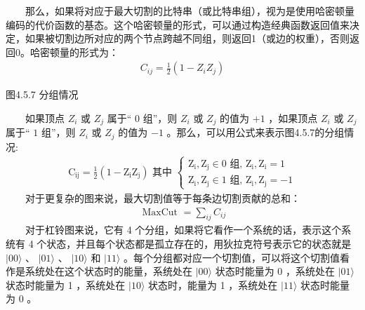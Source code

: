\documentclass[a4paper,11pt,english]{sphinxmanual}
\begin{document}
\sphinxAtStartPar
  那么，如果将对应于最大切割的比特串（或比特串组），视为是使用哈密顿量编码的代价函数的基态。这个哈密顿量的形式，可以通过构造经典函数返回值来决定，如果被切割边所对应的两个节点跨越不同组，则返回1（或边的权重），否则返回0。哈密顿量的形式为：
\begin{equation*}
\begin{split}C_{i j}=\frac{1}{2}\left(1-Z_{i} Z_{j}\right)\end{split}
\end{equation*}

\begin{center}图4.5.7 分组情况
\end{center}
\sphinxAtStartPar
  如果顶点 \(Z_{i}\) 或  \(Z_{j}\) 属于“ \(0\) 组”，则  \(Z_{i}\) 或  \(Z_{j}\) 的值为 \(+1\) ，如果顶点 \(Z_{i}\) 或  \(Z_{j}\) 属于“ \(1\) 组”，则  \(Z_{i}\) 或  \(Z_{j}\) 的值为  \(-1\) 。那么，可以用公式来表示图4.5.7的分组情况:
\begin{equation*}
\begin{split}\mathrm{C}_{\mathrm{ij}}=\frac{1}{2}\left(1-\mathrm{Z}_{\mathrm{i}} \mathrm{Z}_{\mathrm{j}}\right) \text { 其中 }\left\{\begin{array}{l} \mathrm{Z}_{\mathrm{i}}, \mathrm{Z}_{\mathrm{j}} \in 0 \text { 组, } \mathrm{Z}_{\mathrm{i}}, \mathrm{Z}_{\mathrm{i}}=1 \\ \mathrm{Z}_{\mathrm{i}}, \mathrm{Z}_{\mathrm{j}} \in 1 \text { 组, } \mathrm{Z}_{\mathrm{i}}, \mathrm{Z}_{\mathrm{j}}=-1 \end{array}\right.\end{split}
\end{equation*}
\sphinxAtStartPar
  对于更复杂的图来说，最大切割值等于每条边切割贡献的总和：
\begin{equation*}
\begin{split}\text { MaxCut }=\sum_{i j} C_{i j}\end{split}
\end{equation*}
\sphinxAtStartPar
  对于杠铃图来说，它有 4 个分组，如果将它看作一个系统的话，表示这个系统有 4 个状态，并且每个状态都是孤立存在的，用狄拉克符号表示它的状态就是  \(|00\rangle\) 、 \(|01\rangle\) 、 \(|10\rangle\) 和  \(|11\rangle\) 。每个分组都对应一个切割值，可以将这个切割值看作是系统处在这个状态时的能量，系统处在 \(|00\rangle\) 状态时能量为 0 ，系统处在  \(|01\rangle\) 状态时能量为 1 ，系统处在  \(|10\rangle\) 状态时，能量为 1 ，系统处在  \(|11\rangle\) 状态时能量为 0 。
\end{document}
